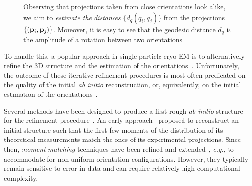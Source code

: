 \begin{figure}
{    Observing that projections taken from close orientations look alike, we aim to \textit{estimate the distances} $\{d_q(q_i, q_j)\}$ from the projections $\{(\mathbf{p}_i, \mathbf{p}_j)\}$.
    Moreover, it is easy to see that the geodesic distance $d_q$ is the amplitude of a rotation between two orientations.
}
\end{figure}

To handle this, a popular approach in single-particle cryo-EM is to alternatively refine the 3D structure and the estimation of the orientations~\cite{penczek1994ribosome,Baker1996,Dempster1977,sigworth1998maximum,scheres2012bayesian,zehni2020joint}. Unfortunately, the outcome of these iterative-refinement procedures is most often predicated on the quality of the initial \textit{ab initio} reconstruction, or, equivalently, on the initial estimation of the orientations~\cite{sorzano2006optimization,henderson2012outcome}.

Several methods have been designed to produce a first rough \textit{ab initio} structure for the refinement procedure~\cite{singer2020computational}. An early approach~\cite{kam1980reconstruction} proposed to reconstruct an initial structure such that the first few moments of the distribution of its theoretical measurements match the ones of its experimental projections. Since then, \textit{moment-matching} techniques have been refined and extended~\cite{salzman1990method,goncharov1988integral,sharon2019method}, \textit{e.g.}, to accommodate for non-uniform orientation configurations. However, they typically remain sensitive to error in data and can require relatively high computational complexity.  %

